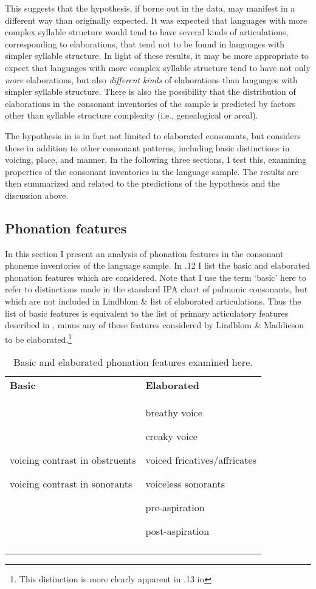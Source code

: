   This suggests that the hypothesis, if borne out in the data, may manifest in a different way than originally expected. It was expected that languages with more complex syllable structure would tend to have several kinds of articulations, corresponding to elaborations, that tend not to be found in languages with simpler syllable structure. In light of these results, it may be more appropriate to expect that languages with more complex syllable structure tend to have not only \textit{more} elaborations, but also \textit{different} \textit{kinds} of elaborations than languages with simpler syllable structure. There is also the possibility that the distribution of elaborations in the consonant inventories of the sample is predicted by factors other than syllable structure complexity (i.e., genealogical or areal).

  The hypothesis in  is in fact not limited to elaborated consonants, but considers these in addition to other consonant patterns, including basic distinctions in voicing, place, and manner. In the following three sections, I test this, examining properties of the consonant inventories in the language sample. The results are then summarized and related to the predictions of the hypothesis and the discussion above.

\subsection{Phonation features}\label{sec:4.4.3}

  In this section I present an analysis of phonation features in the consonant phoneme inventories of the language sample. In .12 I list the basic and elaborated phonation features which are considered. Note that I use the term ‘basic’ here to refer to distinctions made in the standard IPA chart of pulmonic consonants, but which are not included in Lindblom \&  list of elaborated articulations. Thus the list of basic features is equivalent to the list of primary articulatory features described in , minus any of those features considered by Lindblom \& Maddieson to be elaborated.\footnote{ \textrm{This distinction is more clearly apparent in .13 in }}

\begin{table}
\begin{tabularx}{\textwidth}{XX}
\lsptoprule

\textbf{Basic} & \textbf{Elaborated}\\
voicing contrast in obstruents

voicing contrast in sonorants & breathy voice

creaky voice

voiced fricatives/affricates

voiceless sonorants

pre-aspiration

post-aspiration\\
\lspbottomrule
\end{tabularx}
\caption{\label{4.12}Basic and elaborated phonation features examined here.}
\end{table}

